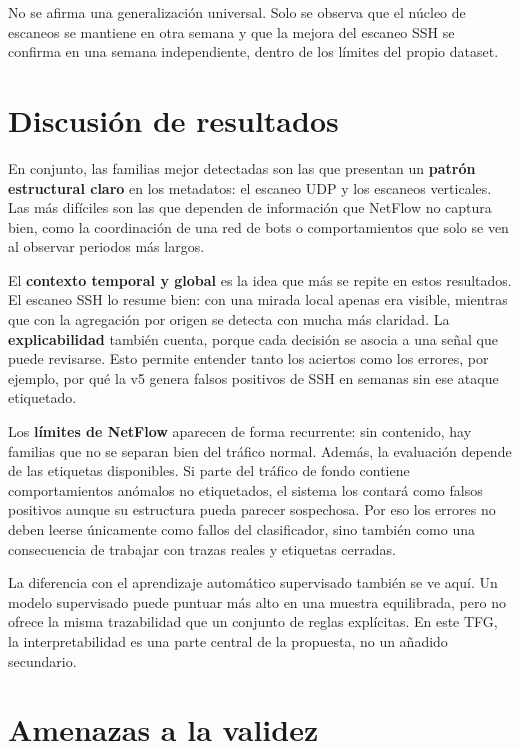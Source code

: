 No se afirma una generalización universal. Solo se observa que el núcleo de escaneos se mantiene en otra semana y que la mejora del escaneo SSH se confirma en una semana independiente, dentro de los límites del propio dataset.

\section{Discusión de resultados}
\label{sec:exp_discusion}

En conjunto, las familias mejor detectadas son las que presentan un \textbf{patrón estructural claro} en los metadatos: el escaneo UDP y los escaneos verticales. Las más difíciles son las que dependen de información que NetFlow no captura bien, como la coordinación de una red de bots o comportamientos que solo se ven al observar periodos más largos.

El \textbf{contexto temporal y global} es la idea que más se repite en estos resultados. El escaneo SSH lo resume bien: con una mirada local apenas era visible, mientras que con la agregación por origen se detecta con mucha más claridad. La \textbf{explicabilidad} también cuenta, porque cada decisión se asocia a una señal que puede revisarse. Esto permite entender tanto los aciertos como los errores, por ejemplo, por qué la v5 genera falsos positivos de SSH en semanas sin ese ataque etiquetado.

Los \textbf{límites de NetFlow} aparecen de forma recurrente: sin contenido, hay familias que no se separan bien del tráfico normal. Además, la evaluación depende de las etiquetas disponibles. Si parte del tráfico de fondo contiene comportamientos anómalos no etiquetados, el sistema los contará como falsos positivos aunque su estructura pueda parecer sospechosa. Por eso los errores no deben leerse únicamente como fallos del clasificador, sino también como una consecuencia de trabajar con trazas reales y etiquetas cerradas.

La diferencia con el aprendizaje automático supervisado también se ve aquí. Un modelo supervisado puede puntuar más alto en una muestra equilibrada, pero no ofrece la misma trazabilidad que un conjunto de reglas explícitas. En este TFG, la interpretabilidad es una parte central de la propuesta, no un añadido secundario.

\section{Amenazas a la validez}
\label{sec:exp_amenazas}

